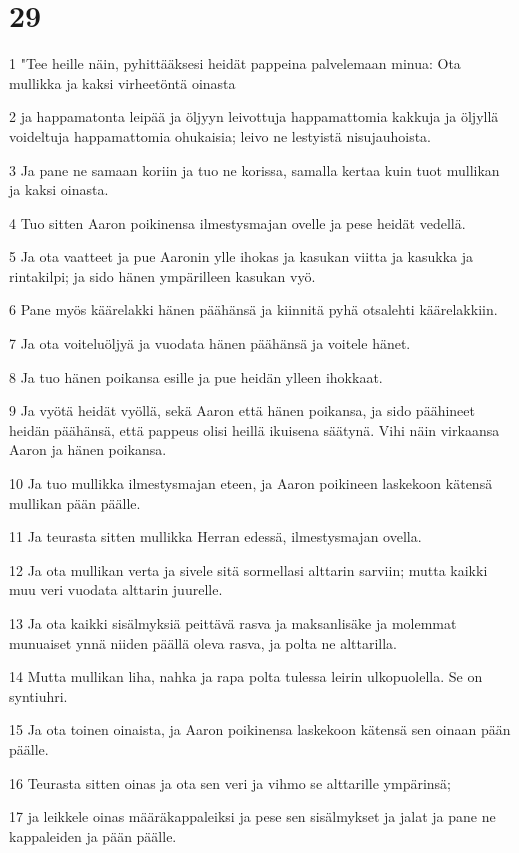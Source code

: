 \chapter{29}

\par 1 "Tee heille näin, pyhittääksesi heidät pappeina palvelemaan minua: Ota mullikka ja kaksi virheetöntä oinasta
\par 2 ja happamatonta leipää ja öljyyn leivottuja happamattomia kakkuja ja öljyllä voideltuja happamattomia ohukaisia; leivo ne lestyistä nisujauhoista.
\par 3 Ja pane ne samaan koriin ja tuo ne korissa, samalla kertaa kuin tuot mullikan ja kaksi oinasta.
\par 4 Tuo sitten Aaron poikinensa ilmestysmajan ovelle ja pese heidät vedellä.
\par 5 Ja ota vaatteet ja pue Aaronin ylle ihokas ja kasukan viitta ja kasukka ja rintakilpi; ja sido hänen ympärilleen kasukan vyö.
\par 6 Pane myös käärelakki hänen päähänsä ja kiinnitä pyhä otsalehti käärelakkiin.
\par 7 Ja ota voiteluöljyä ja vuodata hänen päähänsä ja voitele hänet.
\par 8 Ja tuo hänen poikansa esille ja pue heidän ylleen ihokkaat.
\par 9 Ja vyötä heidät vyöllä, sekä Aaron että hänen poikansa, ja sido päähineet heidän päähänsä, että pappeus olisi heillä ikuisena säätynä. Vihi näin virkaansa Aaron ja hänen poikansa.
\par 10 Ja tuo mullikka ilmestysmajan eteen, ja Aaron poikineen laskekoon kätensä mullikan pään päälle.
\par 11 Ja teurasta sitten mullikka Herran edessä, ilmestysmajan ovella.
\par 12 Ja ota mullikan verta ja sivele sitä sormellasi alttarin sarviin; mutta kaikki muu veri vuodata alttarin juurelle.
\par 13 Ja ota kaikki sisälmyksiä peittävä rasva ja maksanlisäke ja molemmat munuaiset ynnä niiden päällä oleva rasva, ja polta ne alttarilla.
\par 14 Mutta mullikan liha, nahka ja rapa polta tulessa leirin ulkopuolella. Se on syntiuhri.
\par 15 Ja ota toinen oinaista, ja Aaron poikinensa laskekoon kätensä sen oinaan pään päälle.
\par 16 Teurasta sitten oinas ja ota sen veri ja vihmo se alttarille ympärinsä;
\par 17 ja leikkele oinas määräkappaleiksi ja pese sen sisälmykset ja jalat ja pane ne kappaleiden ja pään päälle.
